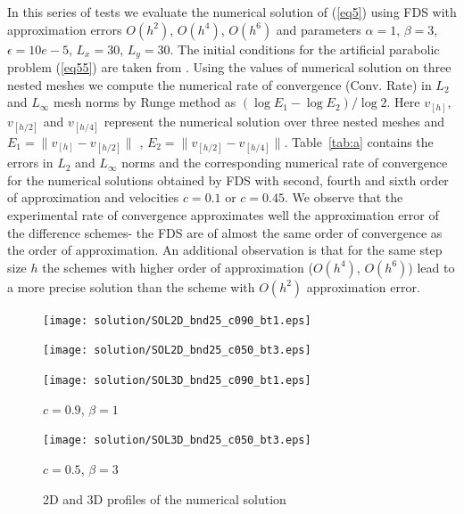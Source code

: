 \documentclass[preprint]{elsarticle}
\newcommand{\rf}[1]{(\ref{#1})}
\begin{document}


 In this series of tests we evaluate the numerical solution of \rf{eq5} using FDS with approximation errors $O(h^2)$, $O(h^4)$, $O(h^6)$ and parameters  
 $\alpha = 1$,   $\beta=3$,  $\epsilon = 10e-5$, 
$L_{x }= 30$, $L_{y} = 30$.
The initial conditions for the artificial parabolic problem \rf{eq55} are taken from  \cite{Ch2011}. 
Using the values of numerical solution on three nested meshes we compute the numerical rate of convergence (Conv. Rate) in $L_2$ and $L_{\infty}$ mesh norms
by Runge method as $(\log E_1 -\log E_2)/\log 2$.  Here  $v_{[h]}$, $v_{ {[h/2]}  }$ and  $v_{ {[h/4]}  }$ represent the numerical solution over three nested meshes and $E_1=\|v_{[h]}-v_{[h/2]}\|$ , $E_2=\|v_{[h/2]}-v_{[h/4]}\|$.  
Table~\ref{tab:a} contains the errors in $L_2$ and $L_{\infty}$ norms and the corresponding numerical rate of convergence for the numerical solutions obtained by FDS with second, fourth and sixth order of approximation and   velocities  $c=0.1$  or $c=0.45$.
We observe that the experimental rate of convergence approximates well the approximation error of the difference schemes- the FDS are of  almost the same order of convergence as the order of approximation. An additional observation  is that  for  the same step size $h$ the schemes with higher order of approximation ($O(h^4)$, $O(h^6)$) lead to a more precise solution than the scheme with $O(h^2)$ approximation error. 

\begin{figure}[ht]
	\begin{minipage}[b]{0.5\linewidth}
		\raggedleft
		\texttt{[image: solution/SOL2D\_bnd25\_c090\_bt1.eps]}
	\end{minipage}
	\begin{minipage}[b]{0.5\linewidth}
		\raggedright
		\texttt{[image: solution/SOL2D\_bnd25\_c050\_bt3.eps]}
	\end{minipage}
	\begin{minipage}[b]{0.45\linewidth}
		 \raggedleft
		\texttt{[image: solution/SOL3D\_bnd25\_c090\_bt1.eps]}
		\centerline{$c = 0.9$, $\beta = 1$}
	\end{minipage}
	\begin{minipage}[b]{0.5\linewidth}
		 \raggedright
		\texttt{[image: solution/SOL3D\_bnd25\_c050\_bt3.eps]}
		\centerline{$c = 0.5$, $\beta = 3$}
	\end{minipage}
	\caption{2D and 3D profiles of the numerical solution}
	\label{fig:solutions}
\end{figure}
\end{document}
